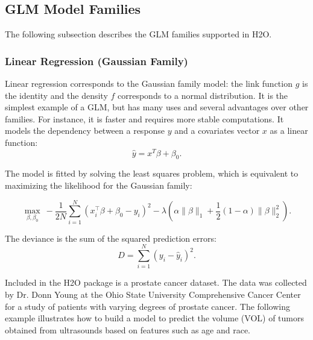 
\subsection{GLM Model Families}
The following subsection describes the GLM families supported in H2O. 

\subsubsection{Linear Regression (Gaussian Family)}
Linear regression corresponds to the Gaussian family model: the link function $g$ is the identity and the density $f$ corresponds to a normal distribution. It is the simplest example of a GLM, but has many uses and
several advantages over other families. For instance, it is faster and requires more stable computations. It models the dependency between a response $y$ and a covariates vector $x$ as a linear function:
$$ \hat{y} = x^T\beta + \beta_0.$$

The model is fitted by solving the least squares problem, which is equivalent to maximizing the likelihood for the Gaussian family:

$$ \max_{\beta,\beta_0} \ - \frac{1}{2N} \sum_{i=1}^N  (x_i^{\top}\beta + \beta_0 - y_i)^2  - \lambda \left(  \alpha \|\beta \|_1 +  \frac{1}{2} (1- \alpha) \| \beta \|_2^2 \right).$$

The deviance is the sum of the squared prediction errors: 
$$ D = \sum_{i=1}^{N} (y_i - \hat{y}_i)^2 . $$


Included in the H2O package is a prostate cancer dataset. The data was collected by Dr. Donn Young at the Ohio State
University Comprehensive Cancer Center for a study of patients with varying degrees of prostate cancer. The
following example illustrates how to build a model to predict the volume (VOL) of tumors obtained from ultrasounds
based on features such as age and race.

\waterExampleInR



\waterExampleInPython


